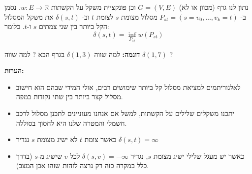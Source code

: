 נתון לנו גרף (מכוון או לא) 
$G = (V, E)$
וכן פונקציית משקל על הקשתות 
$w:E \to \mathbb{R}$.
נסמן ב-%
$P_{st} = (s = v_0, \ldots, v_k = t)$
מסלול מצומת $s$ לצומת $t$
וב-%
$\delta(s,t)$
את משקל המסלול הקל ביותר בין שני צמתים $s$ ו-$t$.
כלומר:
$$
\delta(s,t) = \inf_{P_{st}} w(P_{st})
$$

\textbf{דוגמה:}
למה שווה 
$\delta(1,3)$
בגרף הבא ?
למה שווה
$\delta(1,7)$
?

\begin{center}
\end{center}

\textbf{הערות:}
\begin{itemize}
\item
לאלגוריתמים למציאת מסלול קל ביותר שימושים רבים, 
אולי המידי שבהם הוא חישוב מסלול קצר ביותר בין שתי נקודות במפה.
\item
יתכנו משקלים שלילים על הקשתות, 
למשל אם אנחנו מעוניינים לתכנן מסלול לרכב חשמלי והמטרה שלנו היא לחסוך בסוללה.
\item
כאשר צומת $t$ לא ישיג מצומת $s$ נגדיר 
$\delta(s,t) = \infty$
\item
כאשר יש מעגל שלילי ישיג מצומת $s$, נגדיר
$\delta(s,v) = -\infty$ 
לכל $v$ שישיג מ-$s$ (בדרך כלל במקרה כזה רק נרצה לזהות שזהו אכן המצב).
\end{itemize}
